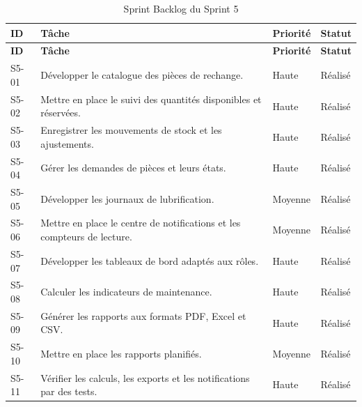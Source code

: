 {\footnotesize
\setlength{\tabcolsep}{4pt}
\begin{longtable}{|p{0.9cm}|>{\raggedright\arraybackslash}p{9.1cm}|>{\raggedright\arraybackslash}p{1.6cm}|>{\raggedright\arraybackslash}p{1.6cm}|}
\caption{Sprint Backlog du Sprint 5}
\label{tab:sprint5-backlog}\\
\hline
\textbf{ID} & \textbf{Tâche} & \textbf{Priorité} & \textbf{Statut} \\
\hline
\endfirsthead

\hline
\textbf{ID} & \textbf{Tâche} & \textbf{Priorité} & \textbf{Statut} \\
\hline
\endhead

S5-01 &
Développer le catalogue des pièces de rechange. &
Haute & Réalisé \\
\hline

S5-02 &
Mettre en place le suivi des quantités disponibles et réservées. &
Haute & Réalisé \\
\hline

S5-03 &
Enregistrer les mouvements de stock et les ajustements. &
Haute & Réalisé \\
\hline

S5-04 &
Gérer les demandes de pièces et leurs états. &
Haute & Réalisé \\
\hline

S5-05 &
Développer les journaux de lubrification. &
Moyenne & Réalisé \\
\hline

S5-06 &
Mettre en place le centre de notifications et les compteurs de lecture. &
Moyenne & Réalisé \\
\hline

S5-07 &
Développer les tableaux de bord adaptés aux rôles. &
Haute & Réalisé \\
\hline

S5-08 &
Calculer les indicateurs de maintenance. &
Haute & Réalisé \\
\hline

S5-09 &
Générer les rapports aux formats PDF, Excel et CSV. &
Haute & Réalisé \\
\hline

S5-10 &
Mettre en place les rapports planifiés. &
Moyenne & Réalisé \\
\hline

S5-11 &
Vérifier les calculs, les exports et les notifications par des tests. &
Haute & Réalisé \\
\hline

\end{longtable}}

